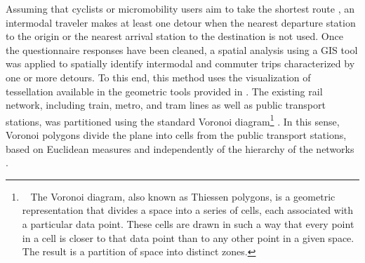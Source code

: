 \begin{refsegment}
Assuming that cyclists or micromobility users aim to take the shortest route \textcolor{blue}{\autocite[116]{heran_distances_2009}}, an intermodal traveler makes at least one detour when the nearest departure station to the origin or the nearest arrival station to the destination is not used. Once the questionnaire responses have been cleaned, a spatial analysis using a \acrshort{GIS} tool was applied to spatially identify intermodal and commuter trips characterized by one or more detours. To this end, this method uses the visualization of tessellation available in the geometric tools provided in . The existing rail network, including train, metro, and tram lines as well as public transport stations, was partitioned using the standard Voronoi diagram\footnote{~
The Voronoi diagram, also known as Thiessen polygons, is a geometric representation that divides a space into a series of cells, each associated with a particular data point. These cells are drawn in such a way that every point in a cell is closer to that data point than to any other point in a given space. The result is a partition of space into distinct zones.
} \textcolor{blue}{\autocite[479]{mota_method_2014}}. In this sense, Voronoi polygons divide the plane into cells from the public transport stations, based on Euclidean measures and independently of the hierarchy of the networks \textcolor{blue}{\autocite[429]{lebedeva_increasing_2018}}.%


\end{refsegment}
